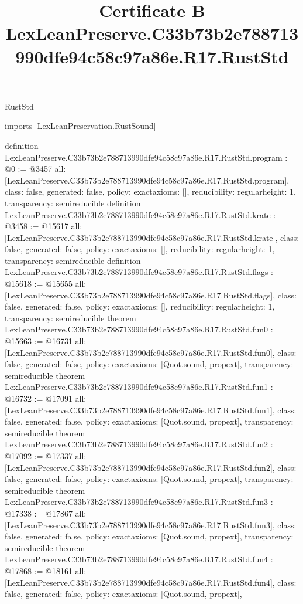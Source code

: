 \begin{lexlean}{RustStd}
\title{Certificate B LexLeanPreserve.C33b73b2e788713990dfe94c58c97a86e.R17.RustStd}
\begin{coremodule}
imports [LexLeanPreservation.RustSound]

definition LexLeanPreserve.C33b73b2e788713990dfe94c58c97a86e.R17.RustStd.program : @0 := @3457 {
  all: [LexLeanPreserve.C33b73b2e788713990dfe94c58c97a86e.R17.RustStd.program],
  class: false,
  generated: false,
  policy: exact{axioms: []},
  reducibility: regular{height: 1},
  transparency: semireducible
}
definition LexLeanPreserve.C33b73b2e788713990dfe94c58c97a86e.R17.RustStd.krate : @3458 := @15617 {
  all: [LexLeanPreserve.C33b73b2e788713990dfe94c58c97a86e.R17.RustStd.krate],
  class: false,
  generated: false,
  policy: exact{axioms: []},
  reducibility: regular{height: 1},
  transparency: semireducible
}
definition LexLeanPreserve.C33b73b2e788713990dfe94c58c97a86e.R17.RustStd.flags : @15618 := @15655 {
  all: [LexLeanPreserve.C33b73b2e788713990dfe94c58c97a86e.R17.RustStd.flags],
  class: false,
  generated: false,
  policy: exact{axioms: []},
  reducibility: regular{height: 1},
  transparency: semireducible
}
theorem LexLeanPreserve.C33b73b2e788713990dfe94c58c97a86e.R17.RustStd.fun0 : @15663 := @16731 {
  all: [LexLeanPreserve.C33b73b2e788713990dfe94c58c97a86e.R17.RustStd.fun0],
  class: false,
  generated: false,
  policy: exact{axioms: [Quot.sound, propext]},
  transparency: semireducible
}
theorem LexLeanPreserve.C33b73b2e788713990dfe94c58c97a86e.R17.RustStd.fun1 : @16732 := @17091 {
  all: [LexLeanPreserve.C33b73b2e788713990dfe94c58c97a86e.R17.RustStd.fun1],
  class: false,
  generated: false,
  policy: exact{axioms: [Quot.sound, propext]},
  transparency: semireducible
}
theorem LexLeanPreserve.C33b73b2e788713990dfe94c58c97a86e.R17.RustStd.fun2 : @17092 := @17337 {
  all: [LexLeanPreserve.C33b73b2e788713990dfe94c58c97a86e.R17.RustStd.fun2],
  class: false,
  generated: false,
  policy: exact{axioms: [Quot.sound, propext]},
  transparency: semireducible
}
theorem LexLeanPreserve.C33b73b2e788713990dfe94c58c97a86e.R17.RustStd.fun3 : @17338 := @17867 {
  all: [LexLeanPreserve.C33b73b2e788713990dfe94c58c97a86e.R17.RustStd.fun3],
  class: false,
  generated: false,
  policy: exact{axioms: [Quot.sound, propext]},
  transparency: semireducible
}
theorem LexLeanPreserve.C33b73b2e788713990dfe94c58c97a86e.R17.RustStd.fun4 : @17868 := @18161 {
  all: [LexLeanPreserve.C33b73b2e788713990dfe94c58c97a86e.R17.RustStd.fun4],
  class: false,
  generated: false,
  policy: exact{axioms: [Quot.sound, propext]},
}
\end{coremodule}
\end{lexlean}
